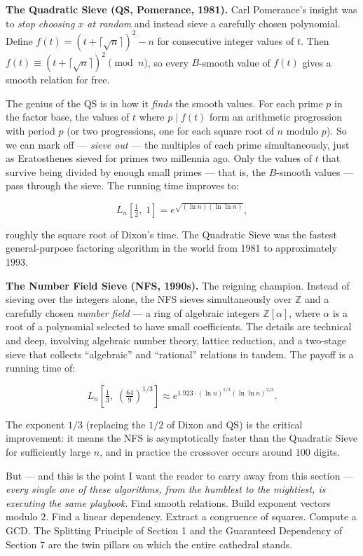 \textbf{The Quadratic Sieve (QS, Pomerance, 1981).} Carl Pomerance's insight was to \emph{stop choosing \(x\) at random} and instead sieve a carefully chosen polynomial. Define \(f(t) = (t + \lceil \sqrt{n} \rceil)^2 - n\) for consecutive integer values of \(t\). Then \(f(t) \equiv (t + \lceil \sqrt{n} \rceil)^2 \pmod{n}\), so every \(B\)-smooth value of \(f(t)\) gives a smooth relation for free.

The genius of the QS is in how it \emph{finds} the smooth values. For each prime \(p\) in the factor base, the values of \(t\) where \(p \mid f(t)\) form an arithmetic progression with period \(p\) (or two progressions, one for each square root of \(n\) modulo \(p\)). So we can mark off --- \emph{sieve out} --- the multiples of each prime simultaneously, just as Eratosthenes sieved for primes two millennia ago. Only the values of \(t\) that survive being divided by enough small primes --- that is, the \(B\)-smooth values --- pass through the sieve. The running time improves to:

\[L_n\!\left[\tfrac{1}{2}, \; 1\right] = e^{\sqrt{(\ln n)(\ln \ln n)}},\]

roughly the square root of Dixon's time. The Quadratic Sieve was the fastest general-purpose factoring algorithm in the world from 1981 to approximately 1993.

\textbf{The Number Field Sieve (NFS, 1990s).} The reigning champion. Instead of sieving over the integers alone, the NFS sieves simultaneously over \(\mathbb{Z}\) and a carefully chosen \emph{number field} --- a ring of algebraic integers \(\mathbb{Z}[\alpha]\), where \(\alpha\) is a root of a polynomial selected to have small coefficients. The details are technical and deep, involving algebraic number theory, lattice reduction, and a two-stage sieve that collects ``algebraic'' and ``rational'' relations in tandem. The payoff is a running time of:

\[L_n\!\left[\tfrac{1}{3}, \; \left(\tfrac{64}{9}\right)^{\!1/3}\right] \approx e^{1.923 \cdot (\ln n)^{1/3} (\ln \ln n)^{2/3}}.\]

The exponent \(1/3\) (replacing the \(1/2\) of Dixon and QS) is the critical improvement: it means the NFS is asymptotically faster than the Quadratic Sieve for sufficiently large \(n\), and in practice the crossover occurs around \(100\) digits.

But --- and this is the point I want the reader to carry away from this section --- \emph{every single one of these algorithms, from the humblest to the mightiest, is executing the same playbook}. Find smooth relations. Build exponent vectors modulo \(2\). Find a linear dependency. Extract a congruence of squares. Compute a GCD. The Splitting Principle of Section 1 and the Guaranteed Dependency of Section 7 are the twin pillars on which the entire cathedral stands.

